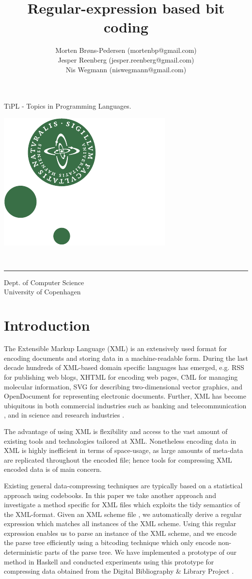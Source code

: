 \documentclass[a4paper, oneside]{memoir}
\title{Regular-expression based bit coding}
\author{Morten Brøns-Pedersen {\footnotesize (mortenbp@gmail.com)}\\
Jesper Reenberg {\footnotesize (jesper.reenberg@gmail.com)} \\
Nis Wegmann {\footnotesize (niswegmann@gmail.com)}}
\makeatletter
\theoremstyle{definition}
\def\maketitle{%
  \null
  \thispagestyle{empty}%
  \vfill
  \begin{center}\leavevmode
    \normalfont
    \Huge{\raggedleft \@title\par}%
    \hrulefill\par
    \Large{\raggedright \subtitle\par}%
    \vskip 2cm
    {\@date\par}%
  \end{center}%
  \vfill
\begin{minipage}{80pt}
\includegraphics*[scale=0.75]{imgs/nat-logo}
\end{minipage}
\begin{minipage}{300pt}
  \begin{flushleft}
    {\large \@author } \\
    {\footnotesize \suplementInfo }

  \end{flushleft}
\end{minipage}
\cleardoublepage %
  \clearpage %
}
\def\subtitle{\footnotesize{TiPL - Topics in Programming Languages.}}
\def\suplementInfo{
  \kern 5pt \hrule width 11pc \kern 5pt %
  Dept. of Computer Science \\
  University of Copenhagen}
\makeatother
\begin{document}
\frontmatter

\maketitle
\thispagestyle{empty}

\begin{abstract}
\end{abstract}

\clearpage

\tableofcontents*

\mainmatter



\chapter{Introduction}

The Extensible Markup Language (XML) \cite{w3c2000} is an extensively used
format for encoding documents and storing data in a machine-readable
form. During the last decade hundreds of XML-based domain specific languages has
emerged, e.g. RSS for publishing web blogs, XHTML for encoding web pages, CML
for managing molecular information, SVG for describing two-dimensional vector
graphics, and OpenDocument for representing electronic documents. Further, XML
has become ubiquitous in both commercial industries such as banking and
telecommunication \cite{lisu2000}, and in science and research industries
\cite{zhlu2002, gi2000}.

The advantage of using XML is flexibility and access to the vast amount of
existing tools and technologies tailored at XML. Nonetheless encoding data
in XML is highly inefficient in terms of space-usage, as large amounts of
meta-data are replicated throughout the encoded file; hence tools for compressing
XML encoded data is of main concern.

Existing general data-compressing techniques are typically based on a statistical
approach using codebooks. In this paper we take another approach and investigate
a method specific for XML files which exploits the tidy semantics of the XML-format.
Given an XML scheme file \cite{wa2001}, we automatically derive a regular
expression which matches all instances of the XML scheme. Using this regular
expression enables us to parse an instance of the XML scheme, and we encode
the parse tree efficiently using a bitcoding technique which only encode
non-deterministic parts of the parse tree. We have implemented a prototype
of our method in Haskell \cite{sugost2008} and conducted experiments using
this prototype for compressing data obtained from the Digital Bibliography \& Library Project .
\end{document}
